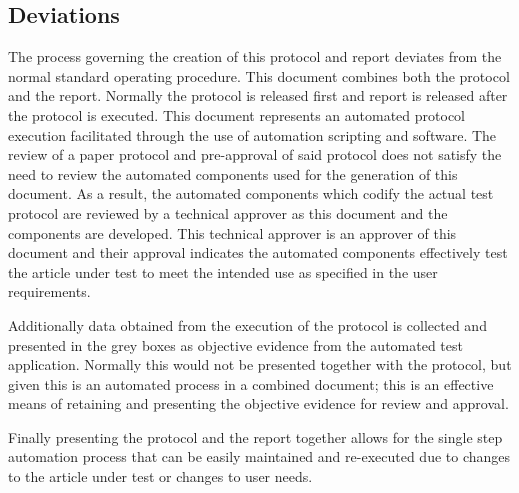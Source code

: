 \subsection{Deviations}
The process governing the creation of this protocol and report deviates from the
normal standard operating procedure.  This document combines both the protocol
and the report.  Normally the protocol is released first and report is released
after the protocol is executed.  This document represents an automated protocol
execution facilitated through the use of automation scripting and software.  The
review of a paper protocol and pre-approval of said protocol does not satisfy
the need to review the automated components used for the generation of this
document.  As a result, the automated components which codify the actual test
protocol are reviewed by a technical approver as this document and the
components are developed.  This technical approver is an approver of this
document and their approval indicates the automated components effectively test 
the article under test to meet the intended use as specified in the user 
requirements.  

Additionally data obtained from the execution of the protocol is collected and
presented in the grey boxes as objective evidence from the automated test
application.  Normally this would not be presented together with the protocol,
but given this is an automated process in a combined document; this is an
effective means of retaining and presenting the objective evidence for review
and approval.

Finally presenting the protocol and the report together allows for the single
step automation process that can be easily maintained and re-executed due to
changes to the article under test or changes to user needs.
